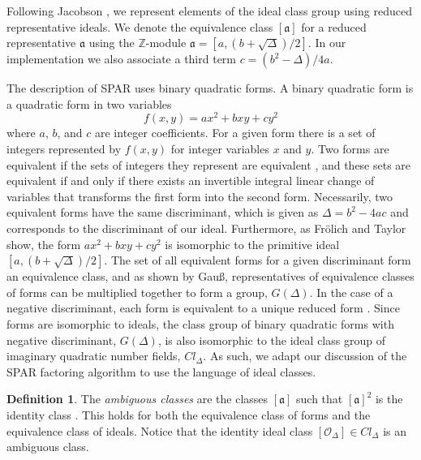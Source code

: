 \documentclass{ucalgthes1}
\theoremstyle{definition}
\newtheorem{defn}[thm]{Definition}
\newcommand{\ZZ}{\mathbb{Z}}
\begin{document}
Following Jacobson \cite{Jacobson1999}, we represent elements of the ideal class group using reduced representative ideals.  We denote the equivalence class $[\mathfrak a]$ for a reduced representative $\mathfrak a$ using the $\ZZ$\mbox{-}module $\mathfrak a = [a, (b + \sqrt\Delta)/2]$. In our implementation we also associate a third term $c = (b^2 - \Delta)/4a$.

The description of SPAR uses binary quadratic forms. A binary quadratic form is a quadratic form in two variables
\[
	f(x, y) = ax^2 + bxy + cy^2
\]
where $a$, $b$, and $c$ are integer coefficients.  For a given form there is a set of integers represented by $f(x, y)$ for integer variables $x$ and $y$. Two forms are equivalent if the sets of integers they represent are equivalent \cite[pp.239-240]{Crandall2001}, and these sets are equivalent if and only if there exists an invertible integral linear change of variables that transforms the first form into the second form. Necessarily, two equivalent forms have the same discriminant, which is given as $\Delta = b^2 - 4ac$ and corresponds to the discriminant of our ideal.  Furthermore, as Fr\"olich and Taylor \cite{Frolich1993} show, the form $ax^2 + bxy + cy^2$ is isomorphic to the primitive ideal $[a, (b + \sqrt\Delta)/2]$.  The set of all equivalent forms for a given discriminant form an equivalence class, and as shown by Gau\ss, representatives of equivalence classes of forms can be multiplied together to form a group, $G(\Delta)$.  In the case of a negative discriminant, each form is equivalent to a unique reduced form \cite[p.241]{Crandall2001}.  Since forms are isomorphic to ideals, the class group of binary quadratic forms with negative discriminant, $G(\Delta)$, is also isomorphic to the ideal class group of imaginary quadratic number fields, $Cl_\Delta$. As such, we adapt our discussion of the SPAR factoring algorithm to use the language of ideal classes.

\begin{defn}
The \emph{ambiguous classes} are the classes $[\mathfrak a]$ such that ${[\mathfrak a]}^2$ is the identity class \cite{Schnorr1984}.  This holds for both the equivalence class of forms and the equivalence class of ideals.  Notice that the identity ideal class $[\mathcal O_\Delta] \in Cl_\Delta$ is an ambiguous class.
\end{defn}
\end{document}
